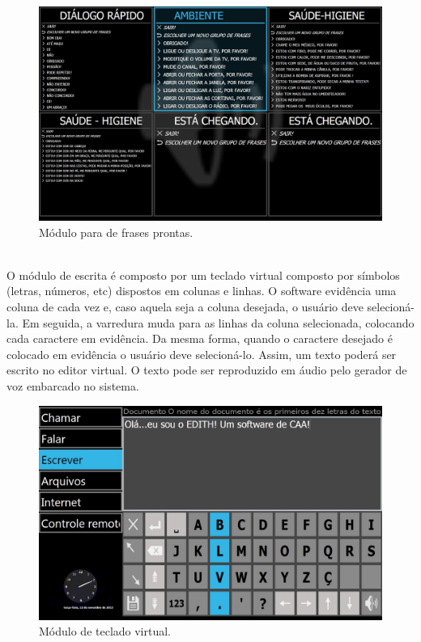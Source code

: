\documentclass[twoside]{article}
\begin{document}
\begin{multicols}{2}
\begin{figure}[H]
\label{fig:edith2}
  \caption{Módulo para de frases prontas.}
  \centering
    \includegraphics[scale = 0.19]{Edith_2_Falar.png}
\end{figure}

\noindent \\O módulo de escrita é composto por um teclado virtual composto por símbolos (letras, números, etc) dispostos em colunas e linhas. O software evidência uma coluna de cada vez e, caso aquela seja a coluna desejada, o usuário deve selecioná-la. Em seguida, a varredura muda para as linhas da coluna selecionada, colocando cada caractere em evidência. Da mesma forma, quando o caractere desejado é colocado em evidência o usuário deve selecioná-lo. Assim, um texto poderá ser escrito no editor virtual. O texto pode ser reproduzido em áudio pelo gerador de voz embarcado no sistema.

\begin{figure}[H]
\label{fig:edith_tecladoVirtual}
  \caption{Módulo de teclado virtual.}
  \centering
    \includegraphics[scale = 0.19]{Edith_3_Escrever.png}
\end{figure}



\end{multicols}
\end{document}
